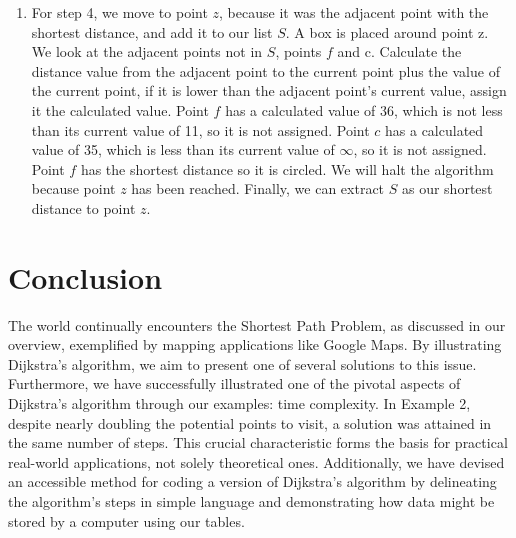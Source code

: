 \documentclass{article}
\begin{document}
\begin{enumerate}
                    \item For step 4, we move to point $z$,  because it was the adjacent point with the shortest distance, and add it to our list $S$. A box is placed around point z. We look at the adjacent points not in $S$, points $f$ and c. Calculate the distance value from the adjacent point to the current point plus the value of the current point, if it is lower than the adjacent point's current value, assign it the calculated value. Point $f$ has a calculated value of 36, which is not less than its current value of 11, so it is not assigned. Point $c$ has a calculated value of 35, which is less than its current value of $\infty$, so it is not assigned. Point $f$ has the shortest distance so it is circled. We will halt the algorithm because point $z$ has been reached. Finally, we can extract $S$ as our shortest distance to point $z$.
                \end{enumerate}



    

\section{Conclusion}

    The world continually encounters the Shortest Path Problem, as discussed in our overview, exemplified by mapping applications like Google Maps. By illustrating Dijkstra's algorithm, we aim to present one of several solutions to this issue. Furthermore, we have successfully illustrated one of the pivotal aspects of Dijkstra's algorithm through our examples: time complexity. In Example 2, despite nearly doubling the potential points to visit, a solution was attained in the same number of steps. This crucial characteristic forms the basis for practical real-world applications, not solely theoretical ones. Additionally, we have devised an accessible method for coding a version of Dijkstra's algorithm by delineating the algorithm's steps in simple language and demonstrating how data might be stored by a computer using our tables.
        
\newpage

\end{document}
